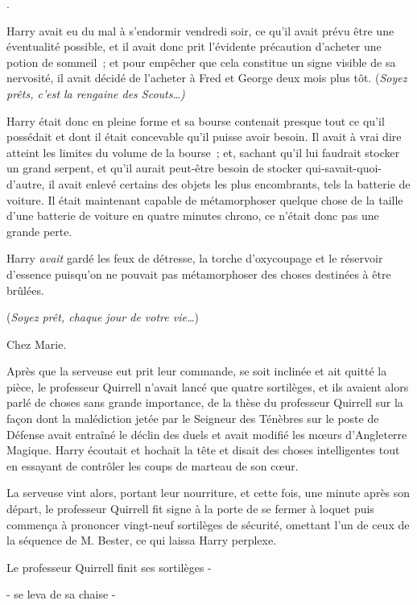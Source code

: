 
.

\hplettrineextrapara
Harry avait eu du mal à s'endormir vendredi soir, ce qu'il avait prévu être une éventualité possible, et il avait donc prit l'évidente précaution d'acheter une potion de sommeil~; et pour empêcher que cela constitue un signe visible de sa nervosité, il avait décidé de l'acheter à Fred et George deux mois plus tôt. (\emph{Soyez prêts, c'est la rengaine des Scouts…)}

Harry était donc en pleine forme et sa bourse contenait presque tout ce qu'il possédait et dont il était concevable qu'il puisse avoir besoin. Il avait à vrai dire atteint les limites du volume de la bourse~; et, sachant qu'il lui faudrait stocker un grand serpent, et qu'il aurait peut-être besoin de stocker qui-savait-quoi-d'autre, il avait enlevé certains des objets les plus encombrants, tels la batterie de voiture. Il était maintenant capable de métamorphoser quelque chose de la taille d'une batterie de voiture en quatre minutes chrono, ce n'était donc pas une grande perte.

Harry \emph{avait} gardé les feux de détresse, la torche d'oxycoupage et le réservoir d'essence puisqu'on ne pouvait pas métamorphoser des choses destinées à être brûlées.

(\emph{Soyez prêt, chaque jour de votre vie…})

Chez Marie.

Après que la serveuse eut prit leur commande, se soit inclinée et ait quitté la pièce, le professeur Quirrell n'avait lancé que quatre sortilèges, et ils avaient alors parlé de choses sans grande importance, de la thèse du professeur Quirrell sur la façon dont la malédiction jetée par le Seigneur des Ténèbres sur le poste de Défense avait entraîné le déclin des duels et avait modifié les mœurs d'Angleterre Magique. Harry écoutait et hochait la tête et disait des choses intelligentes tout en essayant de contrôler les coups de marteau de son cœur.

La serveuse vint alors, portant leur nourriture, et cette fois, une minute après son départ, le professeur Quirrell fit signe à la porte de se fermer à loquet puis commença à prononcer vingt-neuf sortilèges de sécurité, omettant l'un de ceux de la séquence de M. Bester, ce qui laissa Harry perplexe.

Le professeur Quirrell finit ses sortilèges -

- se leva de sa chaise -

